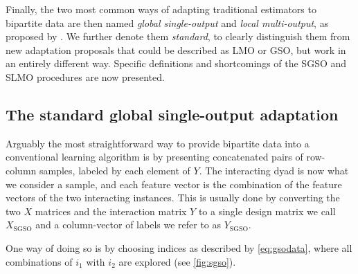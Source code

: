 Finally, the two most common ways of adapting traditional estimators to bipartite data are then named \emph{global single-output} and \emph{local multi-output}, as proposed by . We further denote them \emph{standard}, to clearly distinguish them from new adaptation proposals that could be described as LMO or GSO, but work in an entirely different way.
%
Specific definitions and shortcomings of the SGSO and SLMO procedures are now presented.


\subsection{The standard global single-output adaptation}
\label{sec:sgso}

Arguably the most straightforward way to provide bipartite data into a conventional learning algorithm 
is by presenting concatenated pairs of row-column samples, labeled by each element of $Y$.
%
The interacting dyad is now what we consider a sample, and each feature vector is the combination of the feature vectors of the two interacting instances.
This is usually done by converting the two $X$ matrices and the
interaction matrix $Y$ to a single design matrix we call $X_\text{SGSO}$ and a column-vector of labels we refer to as $Y_\text{SGSO}$.

One way of doing so is by choosing indices as described by \autoref{eq:gsodata}, where
all combinations of $i_1$ with $i_2$ are explored (see \autoref{fig:sgso}).


